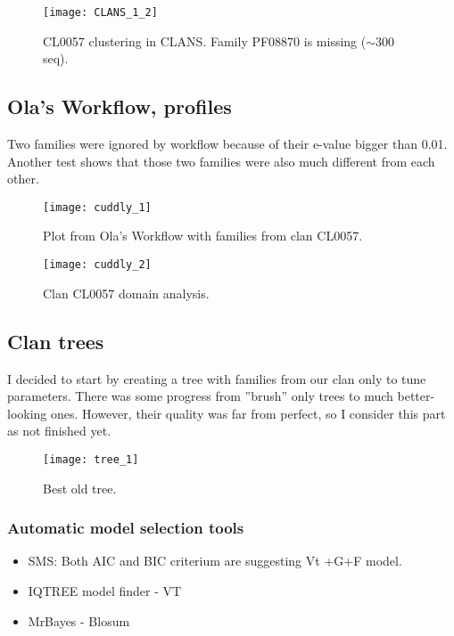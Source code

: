 \begin{figure}[H]
\texttt{[image: CLANS\_1\_2]}
\caption{CL0057 clustering in CLANS. Family PF08870 is missing ($\sim$300 seq).}
\end{figure}

      \subsection{Ola's Workflow, profiles}
Two families were ignored by workflow because of their e-value bigger than 0.01.
Another test shows that those two families were also much different from each other.

\begin{figure}[H]
\texttt{[image: cuddly\_1]}
\caption{Plot from Ola's Workflow with families from clan CL0057.}
\end{figure}

\begin{figure}[H]
\texttt{[image: cuddly\_2]}
\caption{Clan CL0057 domain analysis.}
\end{figure}

        \subsection{Clan trees}
I decided to start by creating a tree with families from our clan only to tune parameters.
There was some progress from ''brush'' only trees to much better-looking ones.
However, their quality was far from perfect, so I consider this part as not finished yet.

\begin{figure}[H]
\begin{center}
\texttt{[image: tree\_1]}
\caption{Best old tree.}
\end{center}
\end{figure}


    \subsubsection{Automatic model selection tools}
\begin{itemize}
    \item SMS: Both AIC and BIC criterium are suggesting Vt +G+F model.
    \item IQTREE model finder - VT
    \item MrBayes - Blosum
\end{itemize}


